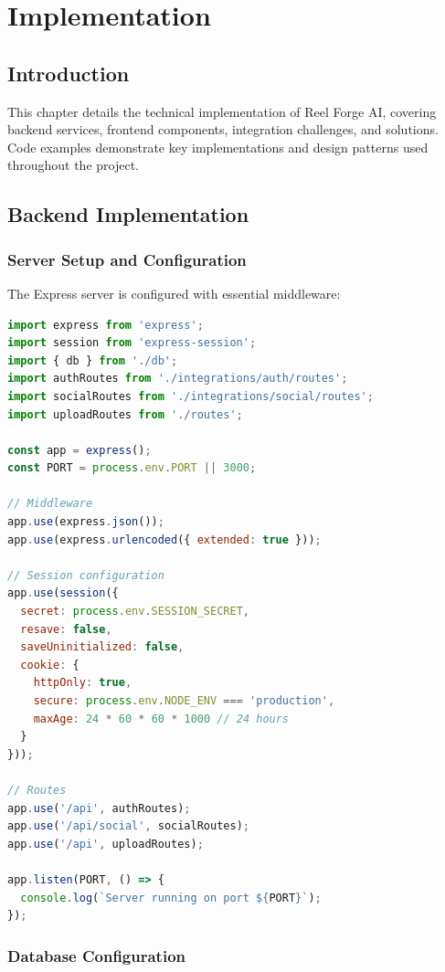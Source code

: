 \chapter{Implementation}

\section{Introduction}

This chapter details the technical implementation of Reel Forge AI, covering backend services, frontend components, integration challenges, and solutions. Code examples demonstrate key implementations and design patterns used throughout the project.

\section{Backend Implementation}

\subsection{Server Setup and Configuration}

The Express server is configured with essential middleware:

\begin{lstlisting}[language=JavaScript, caption=Server Configuration (server/index.ts)]
import express from 'express';
import session from 'express-session';
import { db } from './db';
import authRoutes from './integrations/auth/routes';
import socialRoutes from './integrations/social/routes';
import uploadRoutes from './routes';

const app = express();
const PORT = process.env.PORT || 3000;

// Middleware
app.use(express.json());
app.use(express.urlencoded({ extended: true }));

// Session configuration
app.use(session({
  secret: process.env.SESSION_SECRET,
  resave: false,
  saveUninitialized: false,
  cookie: {
    httpOnly: true,
    secure: process.env.NODE_ENV === 'production',
    maxAge: 24 * 60 * 60 * 1000 // 24 hours
  }
}));

// Routes
app.use('/api', authRoutes);
app.use('/api/social', socialRoutes);
app.use('/api', uploadRoutes);

app.listen(PORT, () => {
  console.log(`Server running on port ${PORT}`);
});
\end{lstlisting}

\subsection{Database Configuration}


